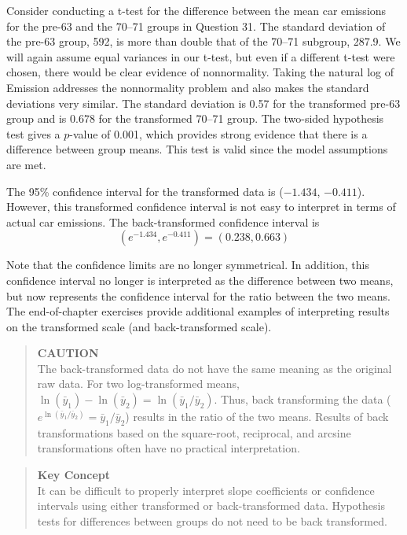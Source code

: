 \documentclass[
]{report}
\begin{document}
Consider conducting a t-test for the difference between the mean car emissions for the pre-63 and the 70--71 groups in Question 31. The standard deviation of the pre-63 group, 592, is more than double that of the 70--71 subgroup, 287.9. We will again assume equal variances in our t-test, but even if a different t-test were chosen, there would be clear evidence of nonnormality. Taking the natural log of Emission addresses the nonnormality problem and also makes the standard deviations very similar. The standard deviation is 0.57 for the transformed pre-63 group and is 0.678 for the transformed 70--71 group. The two-sided hypothesis test gives a \(p\)-value of 0.001, which provides strong evidence that there is a difference between group means. This test is valid since the model assumptions are met.

The 95\% confidence interval for the transformed data is (\(-1.434\), \(-0.411\)). However, this transformed confidence interval is not easy to interpret in terms of actual car emissions. The back-transformed confidence interval is
\[(e^{-1.434}, e^{-0.411}) = (0.238, 0.663)\]

Note that the confidence limits are no longer symmetrical. In addition, this confidence interval no longer is interpreted as the difference between two means, but now represents the confidence interval for the ratio between the two means. The end-of-chapter exercises provide additional examples of interpreting results on the transformed scale (and back-transformed scale).

\begin{quote}
\textbf{CAUTION}\\
The back-transformed data do not have the same meaning as the original raw data. For two log-transformed means, \(\ln(\bar{y}_1) - \ln(\bar{y}_2) = \ln(\bar{y}_1/\bar{y}_2)\). Thus, back transforming the data (\(e^{\ln(\bar{y}_1/\bar{y}_2)} = \bar{y}_1/\bar{y}_2\)) results in the ratio of the two means. Results of back transformations based on the square-root, reciprocal, and arcsine transformations often have no practical interpretation.
\end{quote}

\begin{quote}
\textbf{Key Concept}\\
It can be difficult to properly interpret slope coefficients or confidence intervals using either transformed or back-transformed data. Hypothesis tests for differences between groups do not need to be back transformed.
\end{quote}
\end{document}
